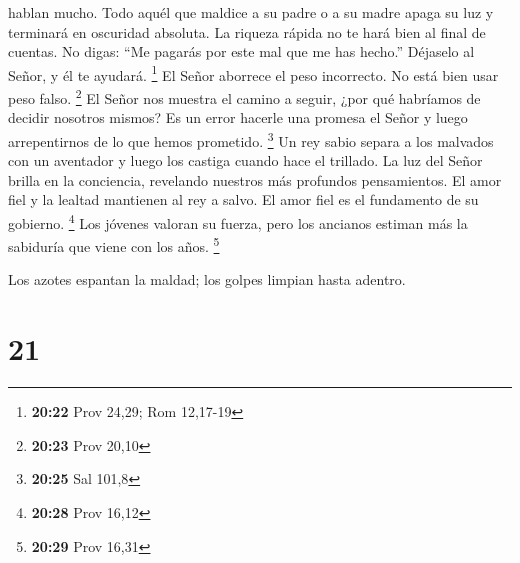 hablan mucho.  Todo aquél que maldice a su padre o a su
madre apaga su luz y terminará en oscuridad absoluta.  La
riqueza rápida no te hará bien al final de cuentas.  No
digas: ``Me pagarás por este mal que me has hecho.'' Déjaselo al Señor,
y él te ayudará. \footnote{\textbf{20:22} Prov 24,29; Rom 12,17-19}
 El Señor aborrece el peso incorrecto. No está bien usar
peso falso. \footnote{\textbf{20:23} Prov 20,10}  El Señor
nos muestra el camino a seguir, ¿por qué habríamos de decidir nosotros
mismos?  Es un error hacerle una promesa el Señor y luego
arrepentirnos de lo que hemos prometido. \footnote{\textbf{20:25} Sal
  101,8}  Un rey sabio separa a los malvados con un
aventador y luego los castiga cuando hace el trillado.  La
luz del Señor brilla en la conciencia, revelando nuestros más profundos
pensamientos.  El amor fiel y la lealtad mantienen al rey a
salvo. El amor fiel es el fundamento de su gobierno. \footnote{\textbf{20:28}
  Prov 16,12}  Los jóvenes valoran su fuerza, pero los
ancianos estiman más la sabiduría que viene con los años. \footnote{\textbf{20:29}
  Prov 16,31}

 Los azotes espantan la maldad; los golpes limpian hasta
adentro.

\hypertarget{section-20}{%
\section{21}\label{section-20}}

